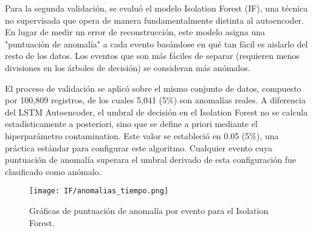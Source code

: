 
Para la segunda validación, se evaluó el modelo Isolation Forest (IF), una técnica no supervisada que opera de manera fundamentalmente distinta al autoencoder. En lugar de medir un error de reconstrucción, este modelo asigna una "puntuación de anomalía" a cada evento basándose en qué tan fácil es aislarlo del resto de los datos. Los eventos que son más fáciles de separar (requieren menos divisiones en los árboles de decisión) se consideran más anómalos.

El proceso de validación se aplicó sobre el mismo conjunto de datos, compuesto por 100,809 registros, de los cuales 5,041 (5\%) son anomalías reales. A diferencia del LSTM Autoencoder, el umbral de decisión en el Isolation Forest no se calcula estadísticamente a posteriori, sino que se define a priori mediante el hiperparámetro contamination. Este valor se estableció en 0.05 (5\%), una práctica estándar para configurar este algoritmo. Cualquier evento cuya puntuación de anomalía superara el umbral derivado de esta configuración fue clasificado como anómalo.

\begin{figure}[ht!]
      \centering
      \texttt{[image: IF/anomalias\_tiempo.png]}
      \caption{Gráficas de puntuación de anomalía por evento para el Isolation Forest.}
      \label{fig:anomalias_if}
\end{figure}

